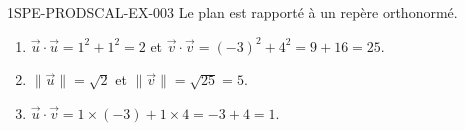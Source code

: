 \begin{corrige}{1SPE-PRODSCAL-EX-003}
Le plan est rapporté à un repère orthonormé.

\begin{enumerate}
\item $\vec{u} \cdot \vec{u} = 1^2 + 1^2 = 2$ et $\vec{v} \cdot \vec{v} = (-3)^2 + 4^2 = 9 + 16 = 25$.
\item $\|\vec{u}\| = \sqrt{2}$ et $\|\vec{v}\| = \sqrt{25} = 5$.
\item $\vec{u} \cdot \vec{v} = 1 \times (-3) + 1 \times 4 = -3 + 4 = 1$.
\end{enumerate}
\end{corrige}
